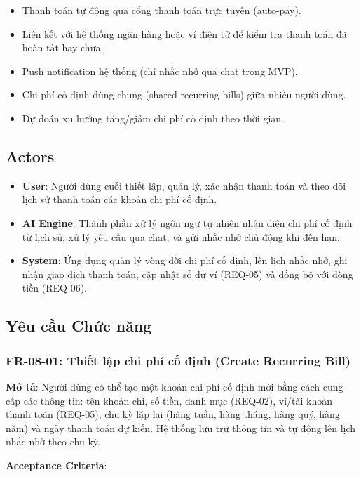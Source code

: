 \begin{itemize}
\item Thanh toán tự động qua cổng thanh toán trực tuyến (auto-pay).
\item Liên kết với hệ thống ngân hàng hoặc ví điện tử để kiểm tra thanh toán đã hoàn tất hay chưa.
\item Push notification hệ thống (chỉ nhắc nhở qua chat trong MVP).
\item Chi phí cố định dùng chung (shared recurring bills) giữa nhiều người dùng.
\item Dự đoán xu hướng tăng/giảm chi phí cố định theo thời gian.
\end{itemize}
\subsection{Actors}

\begin{itemize}
\item \textbf{User}: Người dùng cuối thiết lập, quản lý, xác nhận thanh toán và theo dõi lịch sử thanh toán các khoản chi phí cố định.
\item \textbf{AI Engine}: Thành phần xử lý ngôn ngữ tự nhiên nhận diện chi phí cố định từ lịch sử, xử lý yêu cầu qua chat, và gửi nhắc nhở chủ động khi đến hạn.
\item \textbf{System}: Ứng dụng quản lý vòng đời chi phí cố định, lên lịch nhắc nhở, ghi nhận giao dịch thanh toán, cập nhật số dư ví (REQ-05) và đồng bộ với dòng tiền (REQ-06).
\end{itemize}
\subsection{Yêu cầu Chức năng}



\subsubsection{FR-08-01: Thiết lập chi phí cố định (Create Recurring Bill)}

\textbf{Mô tả}: Người dùng có thể tạo một khoản chi phí cố định mới bằng cách cung cấp các thông tin: tên khoản chi, số tiền, danh mục (REQ-02), ví/tài khoản thanh toán (REQ-05), chu kỳ lặp lại (hàng tuần, hàng tháng, hàng quý, hàng năm) và ngày thanh toán dự kiến. Hệ thống lưu trữ thông tin và tự động lên lịch nhắc nhở theo chu kỳ.



\textbf{Acceptance Criteria}:


